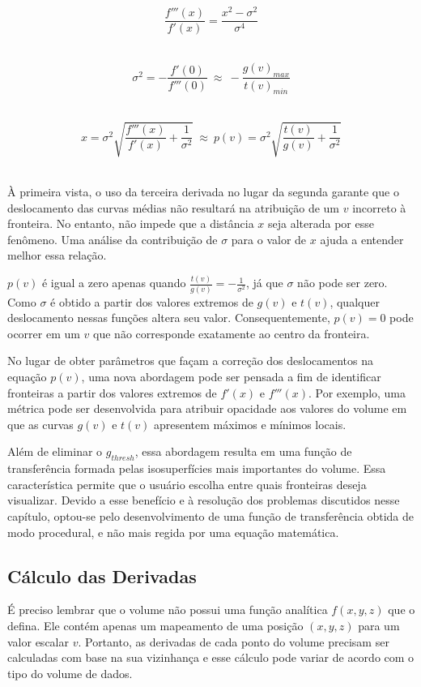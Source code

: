 \begin{equation} \label{eq:sigmax}
	\frac{f'''(x)}{f'(x)} = \frac{x^{2} - \sigma^{2}}{\sigma^{4}}
\end{equation} \

\begin{equation} \label{eq:sigma3}
	\sigma^{2} = -\frac{f'(0)}{f'''(0)} \ \approx \ -\frac{g(v)_{max}}{t(v)_{min}}
\end{equation} \

\begin{equation} \label{eq:x3}
	x = \sigma^{2}\sqrt{\frac{f'''(x)}{f'(x)} + \frac{1}{\sigma^{2}}} \ \approx \ 
	p(v) = \sigma^{2}\sqrt{\frac{t(v)}{g(v)} + \frac{1}{\sigma^{2}}}
\end{equation} \

	À primeira vista, o uso da terceira derivada no lugar da segunda garante que o deslocamento das curvas médias não resultará na atribuição de um $ v $ incorreto à fronteira. No entanto, não impede que a distância $ x $ seja alterada por esse fenômeno. Uma análise da contribuição de $ \sigma $ para o valor de $ x $ ajuda a entender melhor essa relação.
	
	$ p(v) $ é igual a zero apenas quando $ \frac{t(v)}{g(v)} = -\frac{1}{\sigma^{2}} $, já que $ \sigma $ não pode ser zero. Como $ \sigma $ é obtido a partir dos valores extremos de $ g(v) $ e $ t(v) $, qualquer deslocamento nessas funções altera seu valor. Consequentemente, $ p(v) = 0 $ pode ocorrer em um $ v $ que não corresponde exatamente ao centro da fronteira.
	
	No lugar de obter parâmetros que façam a correção dos deslocamentos na equação $ p(v) $, uma nova abordagem pode ser pensada a fim de identificar fronteiras a partir dos valores extremos de $ f'(x) $ e $ f'''(x) $. Por exemplo, uma métrica pode ser desenvolvida para atribuir opacidade aos valores do volume em que as curvas $ g(v) $ e $ t(v) $ apresentem máximos e mínimos locais.
	
	Além de eliminar o $ g_{thresh} $, essa abordagem resulta em uma função de transferência formada pelas isosuperfícies mais importantes do volume. Essa característica permite que o usuário escolha entre quais fronteiras deseja visualizar. Devido a esse benefício e à resolução dos problemas discutidos nesse capítulo, optou-se pelo desenvolvimento de uma função de transferência obtida de modo procedural, e não mais regida por uma equação matemática.
	
\subsection{Cálculo das Derivadas}
	É preciso lembrar que o volume não possui uma função analítica $ f(x, y, z) $ que o defina. Ele contém apenas um mapeamento de uma posição $ (x, y, z) $ para um valor escalar $ v $. Portanto, as derivadas de cada ponto do volume precisam ser calculadas com base na sua vizinhança e esse cálculo pode variar de acordo com o tipo do volume de dados.
	
